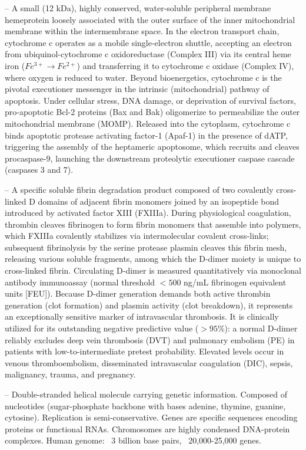 -- A small (12 kDa), highly conserved, water-soluble peripheral membrane hemeprotein loosely associated with the outer surface of the inner mitochondrial membrane within the intermembrane space. In the electron transport chain, cytochrome c operates as a mobile single-electron shuttle, accepting an electron from ubiquinol-cytochrome c oxidoreductase (Complex III) via its central heme iron ($Fe^{3+} \to Fe^{2+}$) and transferring it to cytochrome c oxidase (Complex IV), where oxygen is reduced to water. Beyond bioenergetics, cytochrome c is the pivotal executioner messenger in the intrinsic (mitochondrial) pathway of apoptosis. Under cellular stress, DNA damage, or deprivation of survival factors, pro-apoptotic Bcl-2 proteins (Bax and Bak) oligomerize to permeabilize the outer mitochondrial membrane (MOMP). Released into the cytoplasm, cytochrome c binds apoptotic protease activating factor-1 (Apaf-1) in the presence of dATP, triggering the assembly of the heptameric apoptosome, which recruits and cleaves procaspase-9, launching the downstream proteolytic executioner caspase cascade (caspases 3 and 7).

-- A specific soluble fibrin degradation product composed of two covalently cross-linked D domains of adjacent fibrin monomers joined by an isopeptide bond introduced by activated factor XIII (FXIIIa). During physiological coagulation, thrombin cleaves fibrinogen to form fibrin monomers that assemble into polymers, which FXIIIa covalently stabilizes via intermolecular covalent cross-links; subsequent fibrinolysis by the serine protease plasmin cleaves this fibrin mesh, releasing various soluble fragments, among which the D-dimer moiety is unique to cross-linked fibrin. Circulating D-dimer is measured quantitatively via monoclonal antibody immunoassay (normal threshold $<500$ ng/mL fibrinogen equivalent units [FEU]). Because D-dimer generation demands both active thrombin generation (clot formation) and plasmin activity (clot breakdown), it represents an exceptionally sensitive marker of intravascular thrombosis. It is clinically utilized for its outstanding negative predictive value ($>95\%$): a normal D-dimer reliably excludes deep vein thrombosis (DVT) and pulmonary embolism (PE) in patients with low-to-intermediate pretest probability. Elevated levels occur in venous thromboembolism, disseminated intravascular coagulation (DIC), sepsis, malignancy, trauma, and pregnancy.

-- Double-stranded helical molecule carrying genetic information. Composed of nucleotides (sugar-phosphate backbone with bases adenine, thymine, guanine, cytosine). Replication is semi-conservative. Genes are specific sequences encoding proteins or functional RNAs. Chromosomes are highly condensed DNA-protein complexes. Human genome: ~3 billion base pairs, ~20,000-25,000 genes.

